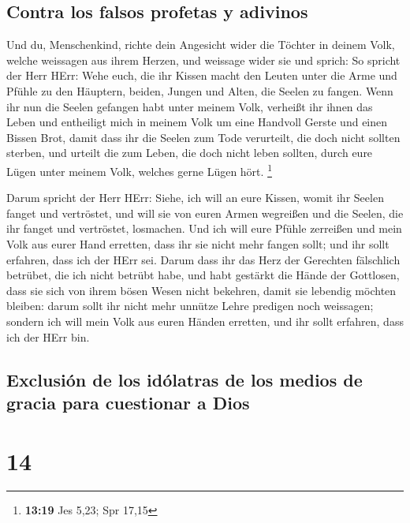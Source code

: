 \hypertarget{contra-los-falsos-profetas-y-adivinos}{%
\subsection{Contra los falsos profetas y
adivinos}\label{contra-los-falsos-profetas-y-adivinos}}

 Und du, Menschenkind, richte dein Angesicht wider die
Töchter in deinem Volk, welche weissagen aus ihrem Herzen, und weissage
wider sie  und sprich: So spricht der Herr HErr: Wehe
euch, die ihr Kissen macht den Leuten unter die Arme und Pfühle zu den
Häuptern, beiden, Jungen und Alten, die Seelen zu fangen. Wenn ihr nun
die Seelen gefangen habt unter meinem Volk, verheißt ihr ihnen das Leben
 und entheiligt mich in meinem Volk um eine Handvoll
Gerste und einen Bissen Brot, damit dass ihr die Seelen zum Tode
verurteilt, die doch nicht sollten sterben, und urteilt die zum Leben,
die doch nicht leben sollten, durch eure Lügen unter meinem Volk,
welches gerne Lügen hört. \footnote{\textbf{13:19} Jes 5,23; Spr 17,15}

 Darum spricht der Herr HErr: Siehe, ich will an eure
Kissen, womit ihr Seelen fanget und vertröstet, und will sie von euren
Armen wegreißen und die Seelen, die ihr fanget und vertröstet,
losmachen.  Und ich will eure Pfühle zerreißen und mein
Volk aus eurer Hand erretten, dass ihr sie nicht mehr fangen sollt; und
ihr sollt erfahren, dass ich der HErr sei.  Darum dass
ihr das Herz der Gerechten fälschlich betrübet, die ich nicht betrübt
habe, und habt gestärkt die Hände der Gottlosen, dass sie sich von ihrem
bösen Wesen nicht bekehren, damit sie lebendig möchten bleiben:
 darum sollt ihr nicht mehr unnütze Lehre predigen noch
weissagen; sondern ich will mein Volk aus euren Händen erretten, und ihr
sollt erfahren, dass ich der HErr bin.

\hypertarget{exclusiuxf3n-de-los-iduxf3latras-de-los-medios-de-gracia-para-cuestionar-a-dios}{%
\subsection{Exclusión de los idólatras de los medios de gracia para
cuestionar a
Dios}\label{exclusiuxf3n-de-los-iduxf3latras-de-los-medios-de-gracia-para-cuestionar-a-dios}}

\hypertarget{section-13}{%
\section{14}\label{section-13}}

